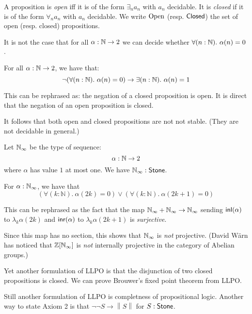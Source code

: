 \newcommand\norm[1]{\left\lVert #1 \right\rVert}


A proposition is {\em open} iff it is of the form $\exists_n a_n$ with $a_n$ decidable.
It is {\em closed} if it is of the form $\forall_n a_n$ with $a_n$ decidable.
We write $\mathrm{Open}$ (resp. $\mathsf{Closed}$) the set of open (resp. closed) propositions.


\begin{theorem}
   It is not the case that for all $\alpha:\mathbb{N}\to 2$ we can decide whether $\forall (n:\mathbb{N}).\ \alpha(n)=0$.
\end{theorem}

\begin{theorem}
  For all $\alpha:\mathbb{N}\to 2$, we have that:
   \[\neg(\forall (n:\mathbb{N}).\ \alpha(n)=0) \to \exists (n:\mathbb{N}).\ \alpha(n)=1\]
\end{theorem}

This can be rephrased as: the negation of a closed proposition is open. It is direct that the negation
of an open proposition is closed.

It follows that both open and closed propositions are not not stable. (They are not decidable in general.)

\begin{definition}
Let $\mathbb{N}_{\infty}$ be the type of sequence:
\[\alpha:\mathbb{N}\to 2\]
where $\alpha$ has value $1$ at most one. We have $\mathbb{N}_{\infty}:\mathsf{Stone}$.
\end{definition}

\begin{theorem}
  For $\alpha:\mathbb {\mathbb{N}_{\infty}}$, 
  we have that 
  \begin{equation}\label{eqnLLPO}
    \left(\forall (k:\mathbb N).\ \alpha(2k) = 0 \right) \vee \left(\forall (k:\mathbb N).\ \alpha(2k+1) = 0\right)
  \end{equation}
\end{theorem}

This can be rephrased as the fact that the map $\mathbb{N}_{\infty}+\mathbb{N}_{\infty}\rightarrow \mathbb{N}_{\infty}$ sending $\mathsf{inl}(\alpha)$ to $\lambda_k \alpha(2k)$
and $\mathsf{inr}(\alpha)$ to $\lambda_k \alpha(2k+1)$ is {\em surjective}.

\medskip

Since this map has no section, this shows that $\mathbb{N}_{\infty}$ is {\em not} projective.
(David W\"arn has noticed that $\mathbb{Z}[\mathbb{N}_{\infty}]$ is {\em not} internally projective in the category of
Abelian groups.)

\medskip

 Yet another formulation of LLPO is that the disjunction of two closed propositions is closed.
 We can prove Brouwer's fixed point theorem from LLPO.

Still another formulation of LLPO is completness of propositional logic. Another way to state
Axiom 2 is that $\neg\neg S\rightarrow \norm{S}$ for $S:\mathsf{Stone}$.


 
